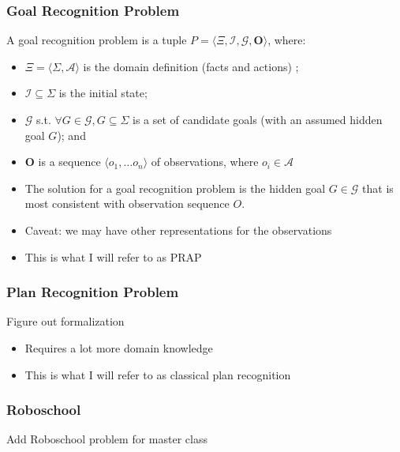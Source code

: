 \documentclass[usenames,dvipsnames]{beamer}
\newcommand{\todo}[1]{ {\color{red} #1} }
\begin{document}
    \begin{frame}[c]\frametitle{Goal Recognition Problem}
		\begin{definition}
			A goal recognition problem is a tuple $P = \langle \Xi, \mathcal{I}, \mathcal{G}, \mathbf{O} \rangle$, where:
       	\begin{itemize}
       		\item $\Xi = \langle \Sigma, \mathcal{A} \rangle$ is the domain definition (facts and actions) ;
       		\item $\mathcal{I} \subseteq \Sigma$ is the initial state;
       		\item $\mathcal{G}$ s.t. $\forall{G \in \mathcal{G}}, G \subseteq \Sigma$ is a set of candidate goals (with an assumed hidden goal $G$); and
       		\item $\mathbf{O}$ is a sequence $\langle o_1, \dots o_n \rangle$ of observations, where $o_i \in \mathcal{A}$
       	\end{itemize}
       	\end{definition}
        
        \begin{itemize}
        	\item The solution for a goal recognition problem is the hidden goal $G \in \mathcal{G}$ that is most consistent with observation sequence $O$.
        	\item Caveat: we may have other representations for the observations
        	\item This is what I will refer to as PRAP
        \end{itemize}
    \end{frame}	
 
	\begin{frame}[c]\frametitle{Plan Recognition Problem}
		\begin{definition}
			\todo{Figure out formalization}
		\end{definition}
		
		\begin{itemize}
			\item Requires a lot more domain knowledge
			\item This is what I will refer to as classical plan recognition 
		\end{itemize}
	\end{frame}
	
	\begin{frame}[c]\frametitle{Roboschool}
		{\color{red} Add Roboschool problem for master class}
	\end{frame}
	
\end{document}
